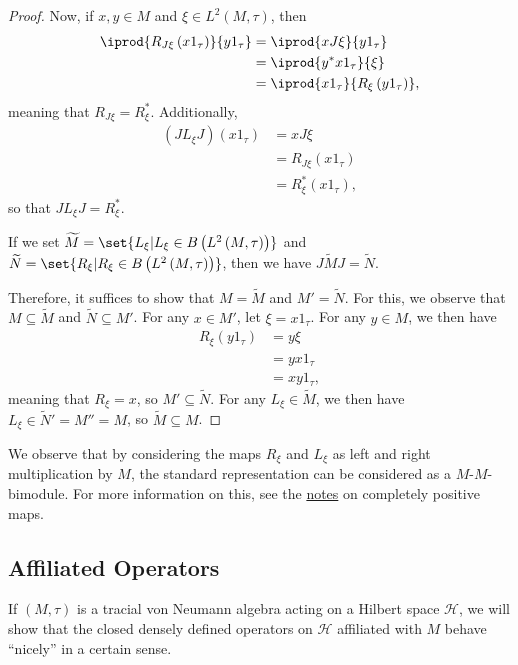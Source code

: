 \documentclass[10pt]{mypackage}
\begin{document}
\begin{proof}
  Now, if $x,y\in M$ and $\xi\in L^2\left( M,\tau \right)$, then
  \begin{align*}
    \iprod{R_{J\xi}\left( x1_{\tau} \right)}{y1_{\tau}} &= \iprod{xJ\xi}{y1_{\tau}}\\
                                                        &= \iprod{y^{\ast}x1_{\tau}}{\xi}\\
                                                        &= \iprod{x1_{\tau}}{R_{\xi}\left( y1_{\tau} \right)},
  \end{align*}
  meaning that $R_{J\xi} = R_{\xi}^{\ast}$. Additionally,
  \begin{align*}
    \left( JL_{\xi}J \right)\left( x1_{\tau} \right) &= xJ\xi\\
                                                     &= R_{J\xi} \left( x1_{\tau} \right)\\
                                                     &= R_{\xi}^{\ast}\left( x1_{\tau} \right),
  \end{align*}
  so that $JL_{\xi}J = R_{\xi}^{\ast}$.

  If we set $ \widetilde{M} = \set{L_{\xi} | L_{\xi}\in B\left( L^2\left( M,\tau \right) \right)} $ and $ \widetilde{N} = \set{R_{\xi} | R_{\xi}\in B\left( L^2\left( M,\tau \right) \right)} $, then we have $J \widetilde{M}J = \widetilde{N}$.

  Therefore, it suffices to show that $M = \widetilde{M}$ and $M' = \widetilde{N}$. For this, we observe that $M\subseteq \widetilde{M}$ and $ \widetilde{N}\subseteq M' $. For any $x\in M'$, let $\xi = x1_{\tau}$. For any $y\in M$, we then have
  \begin{align*}
    R_{\xi}\left( y1_{\tau} \right) &= y\xi\\
                                    &= yx1_{\tau}\\
                                    &= xy1_{\tau},
  \end{align*}
  meaning that $R_{\xi} = x$, so $M'\subseteq \widetilde{N}$. For any $L_{\xi}\in \widetilde{M}$, we then have $L_{\xi}\in \widetilde{N}' = M'' = M$, so $\widetilde{M}\subseteq M$.
\end{proof}
We observe that by considering the maps $R_{\xi}$ and $L_{\xi}$ as left and right multiplication by $M$, the standard representation can be considered as a $M$-$M$-bimodule. For more information on this, see the \href{https://ai-bearing.github.io/Classes_and_Homework/After\%20College/Other\%20Notes/completely_positive_maps.pdf}{notes} on completely positive maps.
\subsection{Affiliated Operators}%
If $\left( M,\tau \right)$ is a tracial von Neumann algebra acting on a Hilbert space $\mathcal{H}$, we will show that the closed densely defined operators on $\mathcal{H}$ affiliated with $M$ behave ``nicely'' in a certain sense.
\end{document}
